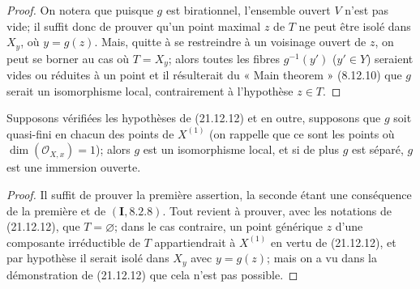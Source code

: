 \begin{proof}
On notera que puisque $g$ est birationnel, l'ensemble ouvert $V$ n'est pas vide; il
suffit donc de prouver qu'un point maximal $z$ de $T$ ne peut être isolé dans $X_y$,
où $y=g(z)$. Mais, quitte à se restreindre à un voisinage ouvert de $z$, on peut se
borner au cas où $T=X_y$; alors toutes les fibres $g^{-1}(y')$ ($y'\in Y$) seraient
vides ou réduites à un point et il résulterait du « Main theorem » (8.12.10) que $g$
serait un isomorphisme local, contrairement à l'hypothèse $z\in T$.
\end{proof}

\begin{corollary}[21.12.13]
\label{IV.21.12.13}
Supposons vérifiées les hypothèses de \textup{(21.12.12)} et en outre, supposons que $g$ soit
quasi-fini en chacun des points de $X^{(1)}$ \textup{(on rappelle que ce sont les points où
$\dim(\mathcal O_{X,x})=1$)}; alors $g$ est un isomorphisme local, et si de plus $g$ est
séparé, $g$ est une immersion ouverte.
\end{corollary}

\begin{proof}
Il suffit de prouver la première assertion, la seconde étant une conséquence de la
première et de $(\mathbf I, 8.2.8)$. Tout revient à prouver, avec les notations de
(21.12.12), que $T=\varnothing$; dans le cas contraire, un point générique $z$ d'une
composante irréductible de $T$ appartiendrait à $X^{(1)}$ en vertu de (21.12.12), et par
hypothèse il serait isolé dans $X_y$ avec $y=g(z)$; mais on a vu dans la démonstration
de (21.12.12) que cela n'est pas possible.
\end{proof}

